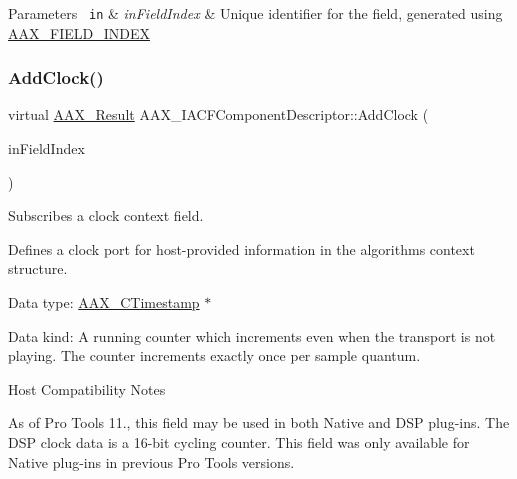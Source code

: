 \begin{DoxyParams}[1]{Parameters}
\mbox{\texttt{ in}}  & {\em in\+Field\+Index} & Unique identifier for the field, generated using \mbox{\hyperlink{a00392_acf807247ecd6e5899dc9dc31644e9a1d}{A\+A\+X\+\_\+\+F\+I\+E\+L\+D\+\_\+\+I\+N\+D\+EX}} \\
\hline
\end{DoxyParams}
\mbox{\label{a01625_af9864953ec953720b844e9ad57a2da14}} 
\subsubsection{\texorpdfstring{AddClock()}{AddClock()}}
{\footnotesize\ttfamily virtual \mbox{\hyperlink{a00392_a4d8f69a697df7f70c3a8e9b8ee130d2f}{A\+A\+X\+\_\+\+Result}} A\+A\+X\+\_\+\+I\+A\+C\+F\+Component\+Descriptor\+::\+Add\+Clock (\begin{DoxyParamCaption}\item[{\mbox{\hyperlink{a00392_ae807f8986143820cfb5d6da32165c9c7}{A\+A\+X\+\_\+\+C\+Field\+Index}}}]{in\+Field\+Index }\end{DoxyParamCaption})\hspace{0.3cm}{\ttfamily [pure virtual]}}



Subscribes a clock context field. 

Defines a clock port for host-\/provided information in the algorithm\textquotesingle{}s context structure.


\begin{DoxyItemize}
\item Data type\+: \mbox{\hyperlink{a00392_aae7325dbfa53a983f208a68cb563fba5}{A\+A\+X\+\_\+\+C\+Timestamp}} $\ast$
\item Data kind\+: A running counter which increments even when the transport is not playing. The counter increments exactly once per sample quantum.

\begin{DoxyRefDesc}{Host Compatibility Notes}
\item[\mbox{\hyperlink{a00786__compatibility_notes000054}{Host Compatibility Notes}}]As of Pro Tools 11., this field may be used in both Native and D\+SP plug-\/ins. The D\+SP clock data is a 16-\/bit cycling counter. This field was only available for Native plug-\/ins in previous Pro Tools versions.\end{DoxyRefDesc}

\end{DoxyItemize}


